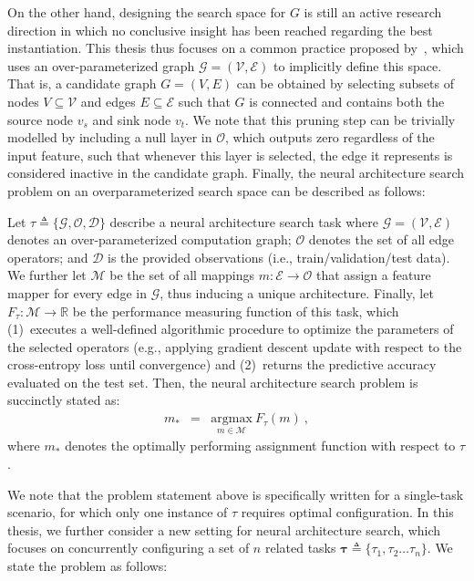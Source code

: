 On the other hand, designing the search space for $G$ is still an active research direction in which no conclusive insight has been reached regarding the best instantiation. This thesis thus focuses on a common practice proposed by~\citet{bender2018understanding}, which uses an over-parameterized graph $\mathcal{G}=(\mathcal{V},\mathcal{E})$ to implicitly define this space. That is, a candidate graph $G=(V, E)$ can be obtained by selecting subsets of nodes $V \subseteq \mathcal{V}$ and edges $E \subseteq \mathcal{E}$ such that $G$ is connected and contains both the source node $v_s$ and sink node $v_t$. We note that this pruning step can be trivially modelled by including a null layer in $\mathcal{O}$, which outputs zero regardless of the input feature, such that whenever this layer is selected, the edge it represents is considered inactive in the candidate graph. Finally, the neural architecture search problem on an overparameterized search space can be described as follows:

\begin{definition} 
Let $\tau \triangleq \{\mathcal{G},\mathcal{O},\mathcal{D}\}$ describe a neural architecture search task where $\mathcal{G}=(\mathcal{V},\mathcal{E})$ denotes an over-parameterized computation graph; $\mathcal{O}$ denotes the set of all edge operators; and $\mathcal{D}$ is the provided observations (i.e., train/validation/test data). We further let $\mathcal{M}$ be the set of all mappings $m: \mathcal{E} \rightarrow \mathcal{O}$ that assign a feature mapper for every edge in $\mathcal{G}$, thus inducing a unique architecture. Finally, let $F_\tau: \mathcal{M} \rightarrow \mathbb{R}$ be the performance measuring function of this task, which (1)~executes a well-defined algorithmic procedure to optimize the parameters of the selected operators (e.g., applying gradient descent update with respect to the cross-entropy loss until convergence) and (2)~returns the predictive accuracy evaluated on the test set. Then, the neural architecture search problem is succinctly stated as:
\begin{eqnarray}
m_\ast &=& \underset{m \in \mathcal{M}}{\mathrm{argmax}} \  F_\tau(m) \ ,
\end{eqnarray}
where $m_\ast$ denotes the optimally performing assignment function with respect to $\tau$.
\label{c4-def:nasproblem}
\end{definition}
We note that the problem statement above is specifically written for a single-task scenario, for which only one instance of $\tau$ requires optimal configuration. In this thesis, we further consider a new setting for neural architecture search, which focuses on concurrently configuring a set of $n$ related tasks $\boldsymbol{\tau} \triangleq \{\tau_1, \tau_2 \dots \tau_n\}$. We state the problem as follows:

